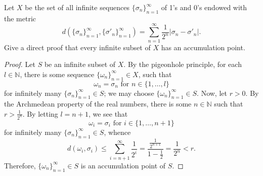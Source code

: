 \documentclass{article}
\begin{document}
\begin{problem}[Spring 2006~\#6]
Let \(X\) be the set of all infinite sequences
\(\{\sigma_n\}_{n=1}^{\infty}\) of 1's and 0's endowed with the metric
\[
	d \left( \{\sigma_n\}_{n=1}^{\infty}, \{\sigma'_n\}_{n=1}^{\infty} \right) = \sum_{n=1}^{\infty} \frac{1}{2^n} \left|\sigma_n - \sigma'_n \right|
	.\]
Give a direct proof that every infinite subset of \(X\) has an accumulation point.
\end{problem}
\begin{proof}
	Let \(S\) be an infinite subset of \(X\).  By the pigeonhole principle, for
	each \(l\in \mathbb{N}\), there is some sequence
	\(\{\omega_n\}_{n=1}^{\infty}\in X\), such that
	\[
		\omega_n = \sigma_n \text{ for } n\in \{1, \ldots, l\}
	\]
	for infinitely many \(\{\sigma_n\}_{n=1}^{\infty}\in S\); we may choose
	\(\{\omega_n\}_{n=1}^{\infty}\in S\).  Now, let \(r > 0\).  By the Archmedean
	property of the real numbers, there is some \(n\in \mathbb{N}\) such that \(r
	> \frac{1}{2^{n}}\).  By letting \(l = n+1\), we see that
	\[
		\omega_i = \sigma_i \text{ for } i\in \{1, \ldots, n+1\}
	\]
	for infinitely many \(\{\sigma_n\}_{n=1}^{\infty}\in S\), whence
	\[
		d(\omega_i, \sigma_i)\leq \sum_{i=n+1}^{\infty} \frac{1}{2^i} =
		\frac{\frac{1}{2^{n+1}}}{1-\frac{1}{2}} = \frac{1}{2^{n}} < r
		.\]
	Therefore, \(\{\omega_n\}_{n=1}^{\infty}\in S\) is an accumulation point of
	\(S\).
\end{proof}
\end{document}
